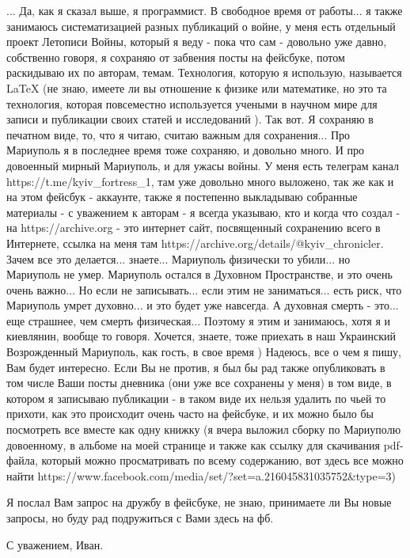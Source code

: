 ... Да, как я сказал выше, я программист. В свободное время от работы... я
также занимаюсь систематизацией разных публикаций о войне, у меня есть
отдельный проект Летописи Войны, который я веду - пока что сам - довольно уже
давно, собственно говоря, я сохраняю от забвения посты на фейсбуке, потом
раскидываю их по авторам, темам. Технология, которую я использую, называется
LaTeX (не знаю, имеете ли вы отношение к физике или математике, но это та
технология, которая повсеместно используется учеными в научном мире для записи
и публикации своих статей и исследований ). Так вот.  Я сохраняю в печатном
виде, то, что я читаю, считаю важным для сохранения...  Про Мариуполь я в
последнее время тоже сохраняю, и довольно много. И про довоенный мирный
Мариуполь, и для ужасы войны. У меня есть телеграм канал
https://t.me/kyiv_fortress_1, там уже довольно много выложено, так же как и на
этом фейсбук - аккаунте, также я постепенно выкладываю собранные  материалы - с
уважением к авторам - я всегда указываю, кто и когда что создал - на
https://archive.org - это интернет сайт, посвященный сохранению всего в
Интернете, ссылка на меня там https://archive.org/details/@kyiv_chronicler.
Зачем все это делается... знаете... Мариуполь физически то убили... но
Мариуполь не умер. Мариуполь остался в Духовном Пространстве, и это очень очень
важно... Но если не записывать... если этим не заниматься... есть риск, что
Мариуполь умрет духовно... и это будет уже навсегда. А духовная смерть - это...
еще страшнее, чем смерть физическая... Поэтому я этим и занимаюсь, хотя я и
киевлянин, вообще то говоря. Хочется, знаете, тоже приехать в наш Украинский
Возрожденный Мариуполь, как гость, в свое время ) Надеюсь, все о чем я пишу,
Вам будет интересно. Если Вы не против, я был бы рад также опубликовать в том
числе Ваши посты дневника (они уже все сохранены у меня) в том виде, в котором
я записываю публикации - в таком виде их нельзя удалить по чьей то прихоти, как
это происходит очень часто на фейсбуке, и их можно было бы посмотреть все
вместе как одну книжку (я вчера выложил сборку по Мариуполю довоенному, в
альбоме на моей странице и также как ссылку для скачивания pdf-файла, который
можно просматривать по всему содержанию, вот здесь все можно найти
https://www.facebook.com/media/set/?set=a.216045831035752&type=3)

Я послал Вам запрос на дружбу в фейсбуке, не знаю, принимаете ли Вы новые
запросы, но буду рад подружиться с Вами здесь на фб.

С уважением, Иван.
